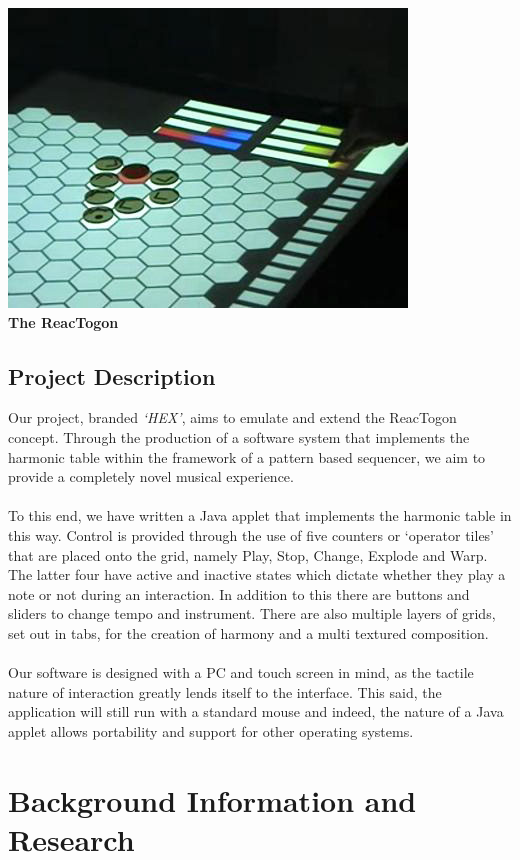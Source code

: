 \documentclass[10pt,a4paper]{article}
\begin{document}
\begin{center}
\includegraphics[scale=0.4]{1.jpg}\\
\textbf{The ReacTogon}
\end{center}

\subsection{Project Description}
Our project, branded \textit{`HEX’}, aims to emulate and extend the ReacTogon concept. Through the production of a software system that implements the harmonic table within the framework of a pattern based sequencer, we aim to provide a completely novel musical experience.\\
\\
To this end, we have written a Java applet that implements the harmonic table in this way. Control is provided through the use of five counters or `operator tiles’ that are placed onto the grid, namely Play, Stop, Change, Explode and Warp. The latter four have active and inactive states which dictate whether they play a note or not during an interaction. In addition to this there are buttons and sliders to change tempo and instrument. There are also multiple layers of grids, set out in tabs, for the creation of harmony and a multi textured composition.\\
\\
Our software is designed with a PC and touch screen in mind, as the tactile nature of interaction greatly lends itself to the interface. This said, the application will still run with a standard mouse and indeed, the nature of a Java applet allows portability and support for other operating systems.

\section{Background Information and Research}
\end{document}
